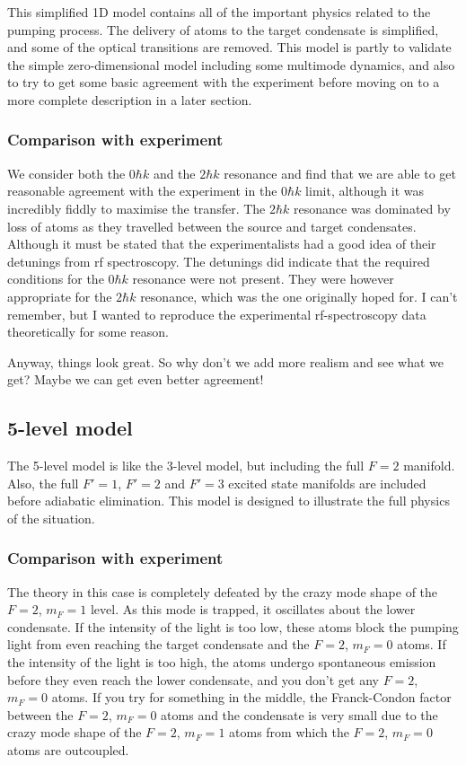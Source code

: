 This simplified 1D model contains all of the important physics related to the pumping process.  The delivery of atoms to the target condensate is simplified, and some of the optical transitions are removed.  This model is partly to validate the simple zero-dimensional model including some multimode dynamics, and also to try to get some basic agreement with the experiment before moving on to a more complete description in a later section.

\subsubsection{Comparison with experiment}

We consider both the $0\hbar k$ and the $2\hbar k$ resonance and find that we are able to get reasonable agreement with the experiment in the $0\hbar k$ limit, although it was incredibly fiddly to maximise the transfer.  The $2\hbar k$ resonance was dominated by loss of atoms as they travelled between the source and target condensates.  Although it must be stated that the experimentalists had a good idea of their detunings from rf spectroscopy.  The detunings did indicate that the required conditions for the $0 \hbar k$ resonance were not present.  They were however appropriate for the $2 \hbar k$ resonance, which was the one originally hoped for.  I can't remember, but I wanted to reproduce the experimental rf-spectroscopy data theoretically for some reason.

Anyway, things look great. So why don't we add more realism and see what we get? Maybe we can get even better agreement!

\subsection{5-level model}

The 5-level model is like the 3-level model, but including the full $F=2$ manifold.  Also, the full $F'=1$, $F'=2$ and $F'=3$ excited state manifolds are included before adiabatic elimination.  This model is designed to illustrate the full physics of the situation.  

\subsubsection{Comparison with experiment}

The theory in this case is completely defeated by the crazy mode shape of the $F=2$, $m_F=1$ level.  As this mode is trapped, it oscillates about the lower condensate.  If the intensity of the light is too low, these atoms block the pumping light from even reaching the target condensate and the $F=2$, $m_F=0$ atoms.  If the intensity of the light is too high, the atoms undergo spontaneous emission before they even reach the lower condensate, and you don't get any $F=2$, $m_F=0$ atoms.  If you try for something in the middle, the Franck-Condon factor between the $F=2$, $m_F=0$ atoms and the condensate is very small due to the crazy mode shape of the $F=2$, $m_F=1$ atoms from which the $F=2$, $m_F=0$ atoms are outcoupled.

